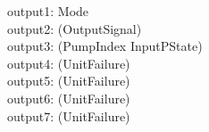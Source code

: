 \documentclass{report} %
\begin{document}
\begin{circus}

  \circchannel\ output1: Mode \\ %
  \circchannel\ output2: (\power OutputSignal) \\ %
  \circchannel\ output3: (PumpIndex \fun InputPState) \\ %
  \circchannel\ output4: (\power UnitFailure) \\ %
  \circchannel\ output5: (\power UnitFailure) \\ %
  \circchannel\ output6: (\power UnitFailure) \\ %
  \circchannel\ output7: (\power UnitFailure) %
                    \\
\end{circus}
\end{document}
